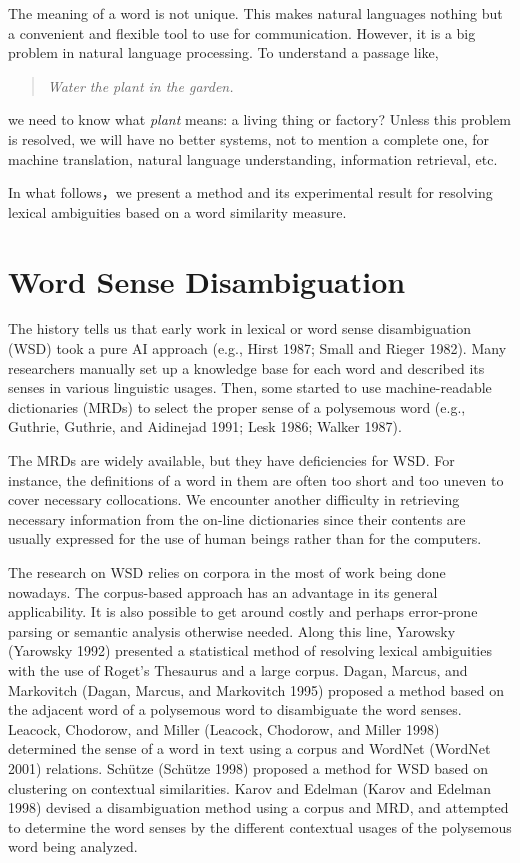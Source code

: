 The meaning of a word is not unique.  This makes natural languages nothing but a convenient
 and flexible tool to use for communication.  However, it is a big problem in natural language 
processing.  To understand a passage like,

\begin{quote}
{\it Water the plant in the garden.}
\end{quote}
we need to know what {\it plant} means: a living thing or factory?  Unless this 
problem is resolved, we will have no better systems, not to mention a complete 
one, for machine translation, natural language understanding, information 
retrieval, etc.


In what follows，we present a method and its experimental result for resolving
 lexical ambiguities based on a word similarity measure.  

\section{Word Sense Disambiguation}

The history tells us that early work in lexical or word sense disambiguation (WSD) took 
a pure AI approach (e.g., Hirst 1987; Small and Rieger 1982).  
Many researchers manually set up a knowledge base for 
each word and described its senses in various linguistic usages.  Then, some started to 
use machine-readable dictionaries (MRDs) to select the proper sense of a polysemous 
word (e.g., Guthrie, Guthrie, and Aidinejad 1991; Lesk 1986; Walker 1987). 

The MRDs are widely available, but they have deficiencies for WSD.  For instance, the 
definitions of a word in them are often too short and too uneven to cover necessary 
collocations.  We encounter another difficulty in retrieving necessary information from
 the on-line dictionaries since their contents are usually expressed for the use of 
human beings rather than for the computers.

The research on WSD relies on corpora in the most of work being done nowadays.  
The corpus-based approach has an advantage in its general applicability.  It is 
also possible to get around costly and perhaps error-prone parsing or semantic analysis 
otherwise needed.  Along this line, Yarowsky (Yarowsky 1992) presented a statistical
 method of resolving 
lexical ambiguities with the use of Roget's Thesaurus and a large corpus.
  Dagan, Marcus, and Markovitch (Dagan, Marcus, and Markovitch 1995) proposed a
 method based on the adjacent word of 
a polysemous word to disambiguate the word senses.  Leacock, Chodorow, 
and Miller (Leacock, Chodorow, and Miller 1998) determined the sense of a 
word in text using a corpus and 
WordNet (WordNet 2001) relations.  Sch\"{u}tze (Sch\"{u}tze 1998) proposed a method 
for WSD based on clustering
 on contextual similarities.  Karov and Edelman (Karov and Edelman 1998) devised 
a disambiguation method 
using a corpus and MRD, and attempted to determine the word senses by the different
 contextual usages of the polysemous word being analyzed.


